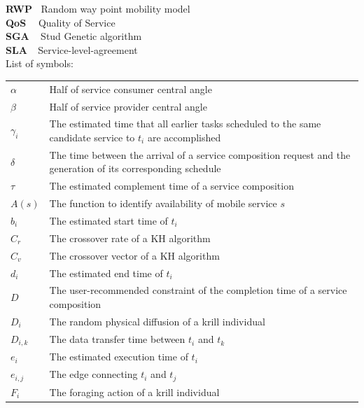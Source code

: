 \documentclass[journal]{IEEEtran}
\begin{document}
\noindent \textbf{RWP}   $\ $   Random way point mobility model \\
\noindent \textbf{QoS}   $\ \ \, $   Quality of Service \\
\noindent \textbf{SGA}   $\ \; $   Stud Genetic algorithm \\
\noindent \textbf{SLA}   $\ \ $   Service-level-agreement \\

\noindent List of symbols: 
~\\

\noindent
\begin{tabular}{@{} l p{7.36cm} }
$\alpha$      &   Half of service consumer central angle \\
$\beta$       &   Half of service provider central angle \\
$\gamma_{i}$  &   The estimated time that all earlier tasks scheduled to the same candidate service to $t_i$ are accomplished  \\
$\delta$      &   The time between the arrival of a service composition request and the generation of its corresponding schedule \\
$\tau$        &   The estimated complement time of a service composition \\
$A(s)$      &   The function to identify availability of mobile service $s$ \\
$b_i$         &   The estimated start time of $t_i$ \\
$C_{r}$       &   The crossover rate of a KH algorithm \\
$C_{v}$       &   The crossover vector of a KH algorithm \\
$d_i$         &   The estimated end time of $t_i$ \\
$D$           &   The user-recommended constraint of the completion time of a service composition \\
$D_i$         &   The random physical diffusion of a krill individual \\
$D_{i,k}$     &   The data transfer time between $t_i$ and $t_k$ \\
$e_i$         &   The estimated execution time of $t_i$ \\
$e_{i,j}$     &   The edge connecting $t_i$ and $t_j$ \\
$F_i$         &   The foraging action of a krill individual \\ 

\end{tabular}
\end{document}
